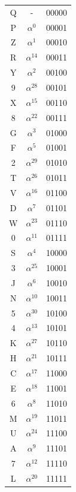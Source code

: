 \documentclass[letterpaper]{article}
\begin{document}
\begin{minipage}[b]{0.3\linewidth}
\begin{center}
\begin{tabular}{|ccc|}
\hline
Q & - & 00000 \\
P & $\alpha^0$ & 00001 \\
Z & $\alpha^1$ & 00010 \\
R & $\alpha^{14}$ & 00011 \\
Y & $\alpha^2$ & 00100 \\
9 & $\alpha^{28}$ & 00101 \\
X & $\alpha^{15}$ & 00110 \\
8 & $\alpha^{22}$ & 00111 \\
G & $\alpha^3$ & 01000 \\
F & $\alpha^5$ & 01001 \\
2 & $\alpha^{29}$ & 01010 \\
T & $\alpha^{26}$ & 01011 \\
V & $\alpha^{16}$ & 01100 \\
D & $\alpha^7$ & 01101 \\
W & $\alpha^{23}$ & 01110 \\
0 & $\alpha^{11}$ & 01111 \\
S & $\alpha^4$ & 10000 \\
3 & $\alpha^{25}$ & 10001 \\
J & $\alpha^6$ & 10010 \\
N & $\alpha^{10}$ & 10011 \\
5 & $\alpha^{30}$ & 10100 \\
4 & $\alpha^{13}$ & 10101 \\
K & $\alpha^{27}$ & 10110 \\
H & $\alpha^{21}$ & 10111 \\
C & $\alpha^{17}$ & 11000 \\
E & $\alpha^{18}$ & 11001 \\
6 & $\alpha^8$ & 11010 \\
M & $\alpha^{19}$ & 11011 \\
U & $\alpha^{24}$ & 11100 \\
A & $\alpha^9$ & 11101 \\
7 & $\alpha^{12}$ & 11110 \\
L & $\alpha^{20}$ & 11111 \\
\hline
\end{tabular}
\end{center}
\end{minipage}

\clearpage
\end{document}
